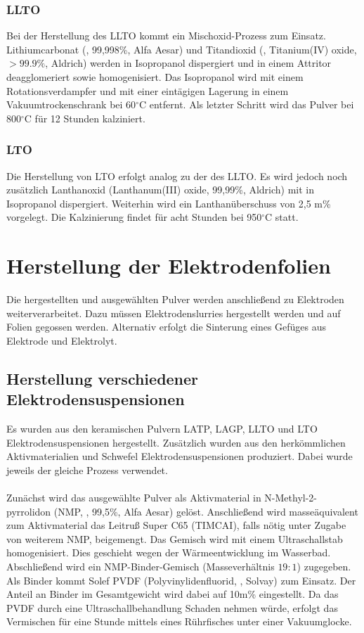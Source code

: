 \documentclass[a4paper, 11pt, headsepline,footsepline,twoside,abstract]{scrbook}
\begin{document}
\subsubsection{LLTO}
Bei der Herstellung des LLTO kommt ein Mischoxid-Prozess zum Einsatz. Lithiumcarbonat (, 99,998\%, Alfa Aesar) und Titandioxid (, Titanium(IV) oxide, $>99.9\%$, Aldrich) werden in Isopropanol dispergiert und in einem Attritor deagglomeriert sowie homogenisiert. Das Isopropanol wird mit einem Rotationsverdampfer und mit einer eintägigen Lagerung in einem Vakuumtrockenschrank bei 60$^\circ$C entfernt. Als letzter Schritt wird das Pulver bei 800$^\circ$C für 12 Stunden kalziniert.
\subsubsection{LTO}
Die Herstellung von LTO erfolgt analog zu der des LLTO. Es wird jedoch noch zusätzlich Lanthanoxid (Lanthanum(III) oxide, 99,99\%, Aldrich) mit in Isopropanol dispergiert. Weiterhin wird ein Lanthanüberschuss von 2,5 m\% vorgelegt. Die Kalzinierung findet für acht Stunden bei 950$^\circ$C statt.
\section{Herstellung der Elektrodenfolien}
Die hergestellten und ausgewählten Pulver werden anschließend zu Elektroden weiterverarbeitet. Dazu müssen Elektrodenslurries hergestellt werden und auf Folien gegossen werden. Alternativ erfolgt die Sinterung eines Gefüges aus Elektrode und Elektrolyt.
\subsection{Herstellung verschiedener Elektrodensuspensionen}
Es wurden aus den keramischen Pulvern LATP, LAGP, LLTO und LTO  Elektrodensuspensionen hergestellt. Zusätzlich wurden aus den herkömmlichen Aktivmaterialien  und Schwefel Elektrodensuspensionen produziert. Dabei wurde jeweils der gleiche Prozess verwendet. 
\\\\
Zunächst wird das ausgewählte Pulver als Aktivmaterial in N-Methyl-2-pyrrolidon (NMP, , 99,5\%, Alfa Aesar) gelöst. Anschließend wird masseäquivalent zum Aktivmaterial das Leitruß Super C65 (TIMCAI), falls nötig unter Zugabe von weiterem NMP, beigemengt. Das Gemisch wird mit einem Ultraschallstab homogenisiert. Dies geschieht wegen der Wärmeentwicklung im Wasserbad. Abschließend wird ein NMP-Binder-Gemisch (Masseverhältnis $19:1$) zugegeben. Als Binder kommt Solef PVDF (Polyvinylidenfluorid, , Solvay) zum Einsatz. Der Anteil an Binder im Gesamtgewicht wird dabei auf 10m\% eingestellt. Da das PVDF durch eine Ultraschallbehandlung Schaden nehmen würde, erfolgt das Vermischen für eine Stunde mittels eines Rührfisches unter einer Vakuumglocke.
\end{document}
